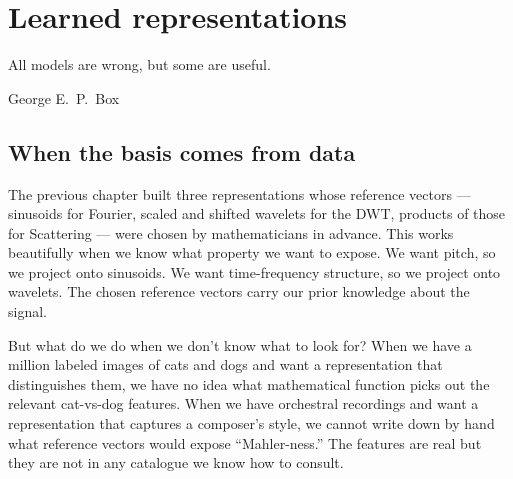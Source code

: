%

\chapter{Learned representations}

\epigraph{All models are wrong, but some are useful.}{George E.~P.~Box}

\section{When the basis comes from data}

\noindent The previous chapter built three representations whose
reference vectors --- sinusoids for Fourier, scaled and shifted wavelets
for the DWT, products of those for Scattering --- were chosen by
mathematicians in advance.  This works beautifully when we know what
property we want to expose.  We want pitch, so we project onto
sinusoids.  We want time-frequency structure, so we project onto
wavelets.  The chosen reference vectors carry our prior knowledge about
the signal.


But what do we do when we don't know what to look for?  When we have a
million labeled images of cats and dogs and want a representation that
distinguishes them, we have no idea what mathematical function picks
out the relevant cat-vs-dog features.  When we have orchestral recordings
and want a representation that captures a composer's style, we cannot
write down by hand what reference vectors would expose ``Mahler-ness.''
The features are real but they are not in any catalogue we know how to
consult.

